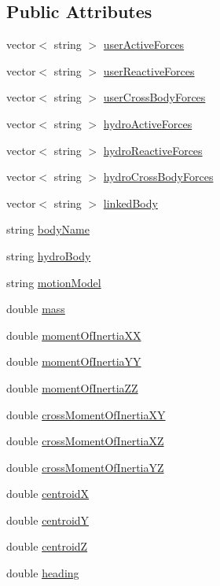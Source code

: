 \subsection*{Public Attributes}
\begin{DoxyCompactItemize}
\item 
vector$<$ string $>$ \hyperlink{class_body_a76e1e921e0cec08caed125073844c217}{user\-Active\-Forces}
\item 
vector$<$ string $>$ \hyperlink{class_body_af74f87986817f8c5cbd8408b29d04063}{user\-Reactive\-Forces}
\item 
vector$<$ string $>$ \hyperlink{class_body_a0ab89cfc3da49d74fa35ed90a0740e28}{user\-Cross\-Body\-Forces}
\item 
vector$<$ string $>$ \hyperlink{class_body_af307fb84335ee5e795b44595ce63015c}{hydro\-Active\-Forces}
\item 
vector$<$ string $>$ \hyperlink{class_body_a45e72e2a50d93068862b57bf4850a43b}{hydro\-Reactive\-Forces}
\item 
vector$<$ string $>$ \hyperlink{class_body_ad5ab2bc2f00fcb646a27398b0245696d}{hydro\-Cross\-Body\-Forces}
\item 
vector$<$ string $>$ \hyperlink{class_body_aabf9875fae852bd842d4b2b57d25eb73}{linked\-Body}
\item 
string \hyperlink{class_body_aa1ea62768021b84bb1c290c6bfaedbfe}{body\-Name}
\item 
string \hyperlink{class_body_a843782f1874dd366786864d9d3e0d9b7}{hydro\-Body}
\item 
string \hyperlink{class_body_a013a08fbeb1dd82131735dade5faa972}{motion\-Model}
\item 
double \hyperlink{class_body_abeaee44e6bc187426a1012bdaacb6eb4}{mass}
\item 
double \hyperlink{class_body_af29b06cfb14adbd1ad58d10a138a43c4}{moment\-Of\-Inertia\-X\-X}
\item 
double \hyperlink{class_body_adc1f40d6f14c7fea48f261170b8f4746}{moment\-Of\-Inertia\-Y\-Y}
\item 
double \hyperlink{class_body_a6f7c025addc1fd46cf72c18713a9cacf}{moment\-Of\-Inertia\-Z\-Z}
\item 
double \hyperlink{class_body_afd989f0185a85ef68120e88d6564631f}{cross\-Moment\-Of\-Inertia\-X\-Y}
\item 
double \hyperlink{class_body_a15c460e8cc8ae20b2420b379c0a6c760}{cross\-Moment\-Of\-Inertia\-X\-Z}
\item 
double \hyperlink{class_body_a552260d9dc6a203857955df8cc58662a}{cross\-Moment\-Of\-Inertia\-Y\-Z}
\item 
double \hyperlink{class_body_a5dc912a4a096590e90fd681a01ffc708}{centroid\-X}
\item 
double \hyperlink{class_body_aac1b166131421c882d1ec647b740c865}{centroid\-Y}
\item 
double \hyperlink{class_body_a834c22ac029cd86bc72185f027cdf74f}{centroid\-Z}
\item 
double \hyperlink{class_body_afe24a9330df6c053cc4fbbd03d477954}{heading}
\end{DoxyCompactItemize}


